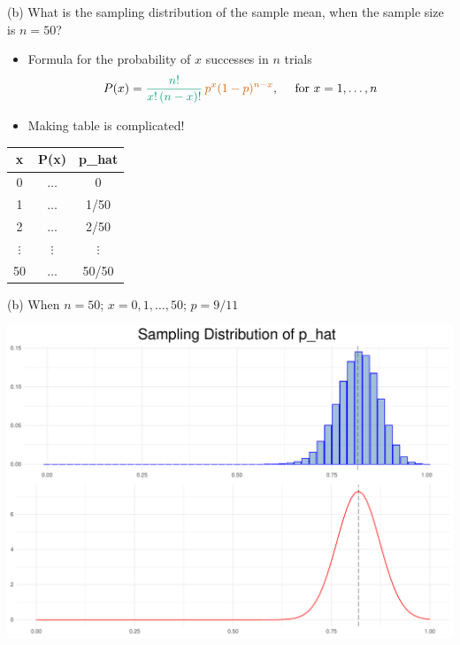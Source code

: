 \documentclass[
  11pt,
  ignorenonframetext,
]{beamer}
\begin{document}
\begin{frame}{(b) What is the sampling distribution of the sample mean,
when the sample size is \(n = 50\)?}
\protect\hypertarget{b-what-is-the-sampling-distribution-of-the-sample-mean-when-the-sample-size-is-n-50}{}
\begin{itemize}
\item
  Formula for the probability of \(x\) successes in \(n\) trials \small
  \[
  P(x) ={\color{green}{\frac{n!}{x!\,(n-x)!}}}\,{\color{red}{p^x(1-p)^{n-x}}}, \quad \text{ for } {x = 1,\ldots,n}
  \]
\item
  Making table is complicated! \small
\end{itemize}

\begin{table}
\centering
\begin{tabular}{ccc}
\hline
x & P(x) & p\_hat \tabularnewline
\hline
0 & $\ldots$ & 0 \tabularnewline
1 & $\ldots$ & 1/50\tabularnewline
2 & $\ldots$ & 2/50 \tabularnewline
$\vdots$ & $\vdots$ & $\vdots$ \tabularnewline
50 & $\ldots$ & 50/50 \tabularnewline
\hline
\end{tabular}
\end{table}
\end{frame}

\begin{frame}{(b) When \(n = 50\); \(x = 0,1,\ldots,50\); \(p=9/11\)}
\protect\hypertarget{b-when-n-50-x-01ldots50-p911}{}
\begin{center}\includegraphics[width=0.9\linewidth]{ECON1013_Tutorial2_files/figure-beamer/unnamed-chunk-14-1} \end{center}
\end{frame}
\end{document}

